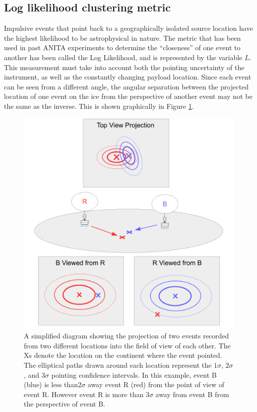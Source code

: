 	
	\subsection{Log likelihood clustering metric}
		Impulsive events that point back to a geographically isolated source location have the highest likelihood to be astrophysical in nature.  The metric that has been used in past ANITA experiments to determine the ``closeness'' of one event to another has been called the Log Likelihood, and is represented by the variable $L$.  This measurement must take into account both the pointing uncertainty of the instrument, as well as the constantly changing payload location.  Since each event can be seen from a different angle, the angular separation between the projected location of one event on the ice from the perspective of another event may not be the same as the inverse.  This is shown graphically in Figure \ref{fig:clusteringProjection}.  

\begin{figure}
	\centering
	\includegraphics[width=\textwidth]{figures/clusteringProjection}
	\caption{A simplified diagram showing the projection of two events recorded from two different locations into the field of view of each other.  The Xs denote the location on the continent where the event pointed.  The elliptical paths drawn around each location represent the $1\sigma$, $2\sigma$, and $3\sigma$ pointing confidence intervals.  In this example, event B (blue) is less than$2\sigma$ away event R (red) from the point of view of event R.  However event R is more than $3\sigma$ away from event B from the perspective of event B.} 
	\label{fig:clusteringProjection}
\end{figure}
		
